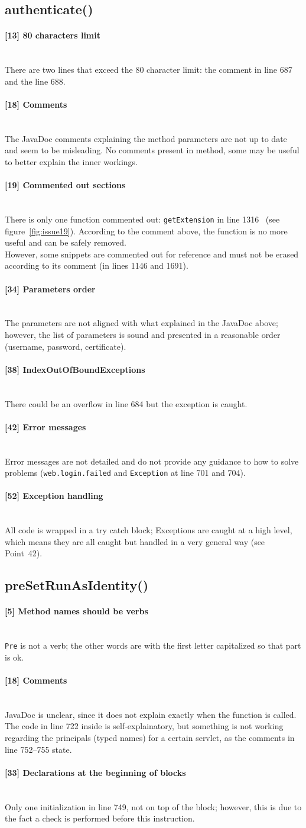 \documentclass[a4paper, 11pt]{article}
\newcommand{\code}[1]{\texttt{#1}}
\newcommand{\issue}[3][?]{
    \paragraph{[#1] #2} \mbox{}\\ #3
}
\begin{document}
\subsection{authenticate()} %
\label{sub:auth}
\issue[13]{80 characters limit}{
    There are two lines that exceed the 80 character limit: the comment
    in line 687 and the line 688. 
}

\issue[18]{Comments} {
The JavaDoc comments explaining the method parameters are not up to date 
and seem to be misleading. No comments present in method, some may be useful 
to better explain the inner workings.
}

\issue[19]{Commented out sections} {
    There is only one function commented out: \code{getExtension} in line 1316 \
    (see figure~\ref{fig:issue19}).
    According to the comment above, the function is no more useful and can 
    be safely removed.  \\
    However, some snippets are commented out for reference and must not be 
    erased according to its comment (in lines 1146 and 1691). 
}

\issue[34]{Parameters order} {
    The parameters are not aligned with what explained in the JavaDoc above; 
    however, the list of parameters is sound and presented in a reasonable order (username, password, certificate). 
}

\issue[38]{IndexOutOfBoundExceptions} {
    There could be an overflow in line 684 but the exception is caught.
}

\issue[42]{Error messages} {
Error messages are not detailed and do not provide any guidance to 
how to solve problems (\code{web.login.failed} and \code{Exception} at
line 701 and 704).
}

\issue[52]{Exception handling} {
All code is wrapped in a try catch block; Exceptions are caught at a high level, 
which means they are all caught but handled in a very general way 
(see Point~42).
}

\subsection{preSetRunAsIdentity()}

\issue[5]{Method names should be verbs} {
    \code{Pre} is not a verb; the other words are with the first letter
    capitalized so that part is ok.
}

\issue[18]{Comments} {
JavaDoc is unclear, since it does not explain exactly when the function is 
called. The code in line 722 inside is self-explainatory, but something is 
not working regarding the principals (typed names) for a certain servlet, 
as the comments in line 752--755 state.
}
\issue[33]{Declarations at the beginning of blocks} {
Only one initialization in line 749, not on top of the block; however, 
this is due to the fact a check is performed before this instruction.
}
\end{document}
